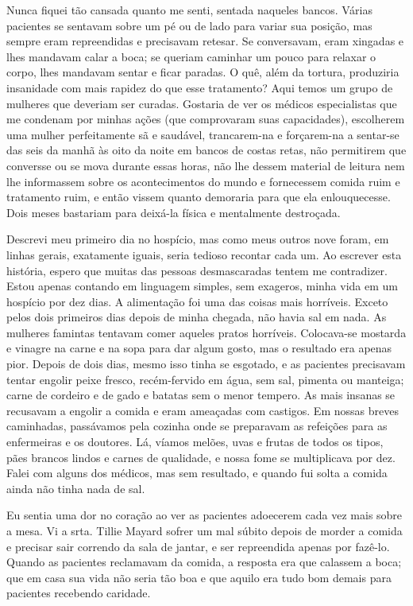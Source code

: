Nunca fiquei tão cansada quanto me senti, sentada naqueles bancos. Várias
pacientes se sentavam sobre um pé ou de lado para variar sua posição,
mas sempre eram repreendidas e precisavam retesar. Se conversavam, eram
xingadas e lhes mandavam calar a boca; se queriam caminhar um pouco para
relaxar o corpo, lhes mandavam sentar e ficar paradas. O quê, além da
tortura, produziria insanidade com mais rapidez do que esse tratamento?
Aqui temos um grupo de mulheres que deveriam ser curadas. Gostaria de
ver os médicos especialistas que me condenam por minhas ações (que
comprovaram suas capacidades), escolherem uma mulher perfeitamente sã e
saudável, trancarem-na e forçarem-na a sentar-se das seis da manhã às
oito da noite em bancos de costas retas, não permitirem que conversse
ou se mova durante essas horas, não lhe dessem material de leitura
nem lhe informassem sobre os acontecimentos do mundo e fornecessem
comida ruim e tratamento ruim, e então vissem quanto demoraria para que
ela enlouquecesse. Dois meses bastariam para deixá-la física e
mentalmente destroçada.

Descrevi meu primeiro dia no hospício, mas como meus outros nove foram,
em linhas gerais, exatamente iguais, seria tedioso recontar cada um. Ao
escrever esta história, espero que muitas das pessoas desmascaradas
tentem me contradizer. Estou apenas contando em linguagem simples, sem
exageros, minha vida em um hospício por dez dias. A alimentação foi uma
das coisas mais horríveis. Exceto pelos dois primeiros dias depois de
minha chegada, não havia sal em nada. As mulheres famintas tentavam
comer aqueles pratos horríveis. Colocava-se mostarda e vinagre na carne
e na sopa para dar algum gosto, mas o resultado era apenas pior. Depois
de dois dias, mesmo isso tinha se esgotado, e as pacientes precisavam
tentar engolir peixe fresco, recém-fervido em água, sem sal, pimenta ou
manteiga; carne de cordeiro e de gado e batatas sem o menor tempero. As
mais insanas se recusavam a engolir a comida e eram ameaçadas com
castigos. Em nossas breves caminhadas, passávamos pela cozinha onde se
preparavam as refeições para as enfermeiras e os doutores. Lá, víamos
melões, uvas e frutas de todos os tipos, pães brancos lindos e carnes
de qualidade, e nossa fome se multiplicava por dez. Falei com alguns dos
médicos, mas sem resultado, e quando fui solta a comida ainda não tinha
nada de sal.

Eu sentia uma dor no coração ao ver as pacientes adoecerem cada vez mais
sobre a mesa. Vi a srta. Tillie Mayard sofrer um mal súbito depois de
morder a comida e precisar sair correndo da sala de jantar, e
ser repreendida apenas por fazê-lo. Quando as pacientes reclamavam da comida, a
resposta era que calassem a boca; que em casa sua vida não seria tão boa
e que aquilo era tudo bom demais para pacientes recebendo caridade.

